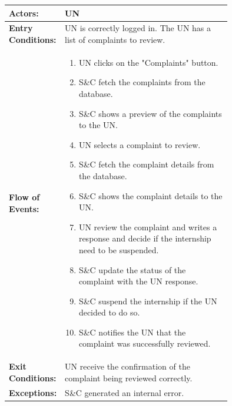 \begin{center}
    \begin{longtable}{|l|p{0.75\linewidth}|}
        \hline
        \textbf{Actors:}           & UN                                                                                                    \\
        \hline
        \textbf{Entry Conditions:} & UN is correctly logged in. The UN has a list of complaints to review.                                 \\
        \hline
        \textbf{Flow of Events:}   & \begin{enumerate}
                                         \item UN clicks on the "Complaints" button.
                                         \item S\&C fetch the complaints from the database.
                                         \item S\&C shows a preview of the complaints to the UN.
                                         \item UN selects a complaint to review.
                                         \item S\&C fetch the complaint details from the database.
                                         \item S\&C shows the complaint details to the UN.
                                         \item UN review the complaint and writes a response and decide if the internship need to be suspended.
                                         \item S\&C update the status of the complaint with the UN response.
                                         \item S\&C suspend the internship if the UN decided to do so.
                                         \item S\&C notifies the UN that the complaint was successfully reviewed.
                                     \end{enumerate} \\
        \hline
        \textbf{Exit Conditions:}  & UN receive the confirmation of the complaint being reviewed correctly.                                \\
        \hline
        \textbf{Exceptions:}       & S\&C generated an internal error.                                                                     \\
        \hline
    \end{longtable}
\end{center}

